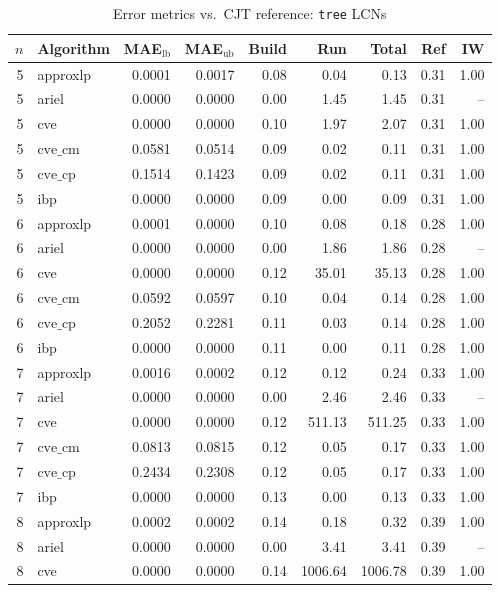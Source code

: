 \documentclass{article}
\begin{document}
\begin{table}[ht]
\centering
\caption{Error metrics vs.\ CJT reference: \texttt{tree} LCNs}
\begin{tabular}{rlrrrrrrr}
\toprule
 $n$ & Algorithm & MAE$_{\text{lb}}$ & MAE$_{\text{ub}}$ & Build & Run & Total & Ref & IW \\
\midrule
 5 & approxlp & 0.0001 & 0.0017 & 0.08 & 0.04 & 0.13 & 0.31 & 1.00 \\
 5 & ariel & 0.0000 & 0.0000 & 0.00 & 1.45 & 1.45 & 0.31 & -- \\
 5 & cve & 0.0000 & 0.0000 & 0.10 & 1.97 & 2.07 & 0.31 & 1.00 \\
 5 & $\text{cve\_cm}$ & 0.0581 & 0.0514 & 0.09 & 0.02 & 0.11 & 0.31 & 1.00 \\
 5 & $\text{cve\_cp}$ & 0.1514 & 0.1423 & 0.09 & 0.02 & 0.11 & 0.31 & 1.00 \\
 5 & ibp & 0.0000 & 0.0000 & 0.09 & 0.00 & 0.09 & 0.31 & 1.00 \\
\hline
 6 & approxlp & 0.0001 & 0.0000 & 0.10 & 0.08 & 0.18 & 0.28 & 1.00 \\
 6 & ariel & 0.0000 & 0.0000 & 0.00 & 1.86 & 1.86 & 0.28 & -- \\
 6 & cve & 0.0000 & 0.0000 & 0.12 & 35.01 & 35.13 & 0.28 & 1.00 \\
 6 & $\text{cve\_cm}$ & 0.0592 & 0.0597 & 0.10 & 0.04 & 0.14 & 0.28 & 1.00 \\
 6 & $\text{cve\_cp}$ & 0.2052 & 0.2281 & 0.11 & 0.03 & 0.14 & 0.28 & 1.00 \\
 6 & ibp & 0.0000 & 0.0000 & 0.11 & 0.00 & 0.11 & 0.28 & 1.00 \\
\hline
 7 & approxlp & 0.0016 & 0.0002 & 0.12 & 0.12 & 0.24 & 0.33 & 1.00 \\
 7 & ariel & 0.0000 & 0.0000 & 0.00 & 2.46 & 2.46 & 0.33 & -- \\
 7 & cve & 0.0000 & 0.0000 & 0.12 & 511.13 & 511.25 & 0.33 & 1.00 \\
 7 & $\text{cve\_cm}$ & 0.0813 & 0.0815 & 0.12 & 0.05 & 0.17 & 0.33 & 1.00 \\
 7 & $\text{cve\_cp}$ & 0.2434 & 0.2308 & 0.12 & 0.05 & 0.17 & 0.33 & 1.00 \\
 7 & ibp & 0.0000 & 0.0000 & 0.13 & 0.00 & 0.13 & 0.33 & 1.00 \\
\hline
 8 & approxlp & 0.0002 & 0.0002 & 0.14 & 0.18 & 0.32 & 0.39 & 1.00 \\
 8 & ariel & 0.0000 & 0.0000 & 0.00 & 3.41 & 3.41 & 0.39 & -- \\
 8 & cve & 0.0000 & 0.0000 & 0.14 & 1006.64 & 1006.78 & 0.39 & 1.00 \\

\end{tabular}
\end{table}
\end{document}
